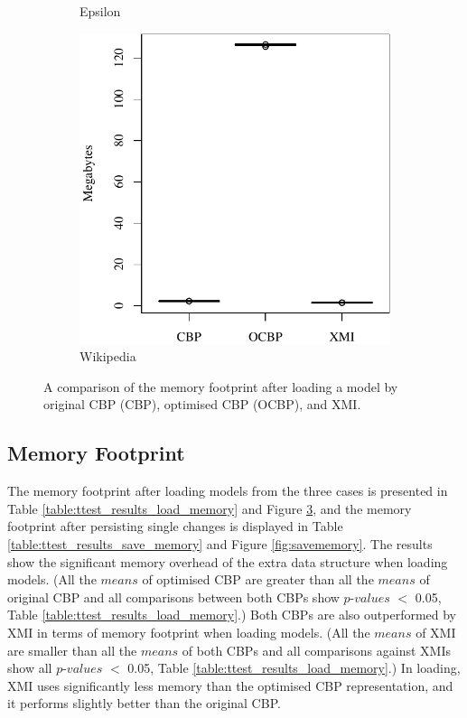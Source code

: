 {\begin{figure}[ht]
\begin{subfigure}{0.325\textwidth}
      \caption{Epsilon}
      \label{fig:load_memory_epsilon}
    \end{subfigure}
    \hfill
    \begin{subfigure}{0.325\textwidth}
      \centering
      \includegraphics[width=\linewidth]{images/ol_load_memory_wikipedia}
      \caption{Wikipedia}
      \label{fig:load_memory_wikipedia}
    \end{subfigure}
    \caption{A comparison of the memory footprint after loading a model by original CBP (CBP), optimised CBP (OCBP), and XMI.}
    \label{fig:loadmemory}
  \end{figure}
 
  \subsection{Memory Footprint}
  \label{subsec:memory_consumption} 
  
  The memory footprint after loading models from the three cases is presented in Table \ref{table:ttest_results_load_memory} and Figure \ref{fig:loadmemory}, and the memory footprint after persisting single changes is displayed in Table \ref{table:ttest_results_save_memory} and Figure \ref{fig:savememory}. The results show the significant memory overhead of the extra data structure when loading models. (All the $means$ of optimised CBP are greater than all the $means$ of original CBP and all comparisons between both CBPs show $p$-$values$ $<$ 0.05, Table \ref{table:ttest_results_load_memory}.) Both CBPs are also outperformed by XMI in terms of memory footprint when loading models. (All the $means$ of XMI are smaller than all the $means$ of both CBPs and all comparisons against XMIs show all $p$-$values$ $<$ 0.05, Table \ref{table:ttest_results_load_memory}.) In loading, XMI uses significantly less memory than the optimised CBP representation, and it performs slightly better than the original CBP.
  
}
